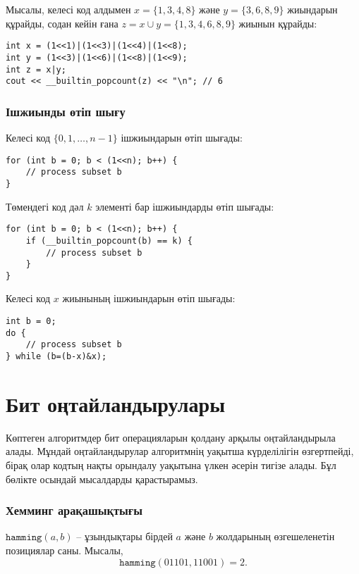 Мысалы, келесі код алдымен $x=\{1,3,4,8\}$ және $y=\{3,6,8,9\}$
жиындарын құрайды, содан кейін ғана $z = x \cup y = \{1,3,4,6,8,9\}$
жиынын құрайды:

\begin{lstlisting}
int x = (1<<1)|(1<<3)|(1<<4)|(1<<8);
int y = (1<<3)|(1<<6)|(1<<8)|(1<<9);
int z = x|y;
cout << __builtin_popcount(z) << "\n"; // 6
\end{lstlisting}

\subsubsection{Ішжиынды өтіп шығу}

Келесі код $\{0,1,\ldots,n-1\}$ ішжиындарын 
өтіп шығады:

\begin{lstlisting}
for (int b = 0; b < (1<<n); b++) {
    // process subset b
}
\end{lstlisting}
Төмендегі код дәл $k$ элементі бар ішжиындарды
өтіп шығады:
\begin{lstlisting}
for (int b = 0; b < (1<<n); b++) {
    if (__builtin_popcount(b) == k) {
        // process subset b
    }
}
\end{lstlisting}
Келесі код $x$ жиынының ішжиындарын өтіп шығады:
\begin{lstlisting}
int b = 0;
do {
    // process subset b
} while (b=(b-x)&x);
\end{lstlisting}

\section{Бит оңтайландырулары}

Көптеген алгоритмдер бит операцияларын
қолдану арқылы оңтайландырыла алады. 
Мұндай оңтайландырулар алгоритмнің
уақытша күрделілігін өзгертпейді,
бірақ олар кодтың нақты орындалу
уақытына үлкен әсерін тигізе алады.
Бұл бөлікте осындай мысалдарды қарастырамыз.

\subsubsection{Хемминг арақашықтығы}


$\texttt{hamming}(a,b)$  --
ұзындықтары бірдей $a$ және $b$ жолдарының өзгешеленетін 
позициялар саны.
Мысалы,
\[\texttt{hamming}(01101,11001)=2.\]

